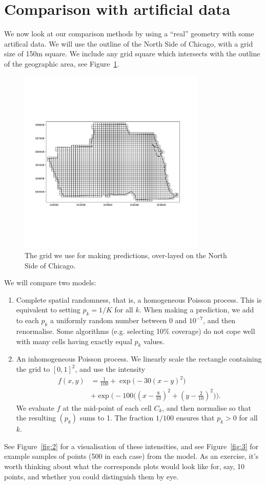 \documentclass[twoside,a4paper,twocolumn,10pt]{article}
\theoremstyle{plain}
\theoremstyle{definition}
\begin{document}
\section{Comparison with artificial data}

We now look at our comparison methods by using a ``real'' geometry with some artifical data.
We will use the outline of the North Side of Chicago, with a grid size of 150m square.  We
include any grid square which intersects with the outline of the geographic area, see
Figure~\ref{fig:1}.

\begin{figure}
    \centering
    \includegraphics[width=3.5in]{../details/grid_over_outline.pdf}
    \caption{\textsf{The grid we use for making predictions, over-layed on the North Side of Chicago.}}
    \label{fig:1}
\end{figure}

We will compare two models:
\begin{enumerate}
\item Complete spatial randomness, that is, a homogeneous Poisson process.  This is equivalent
  to setting $p_k = 1/K$ for all $k$.  When making a prediction, we add to each $p_k$ a uniformly
  random number between $0$ and $10^{-7}$, and then renormalise.  Some algorithms (e.g. selecting
  10\% coverage) do not cope well with many cells having exactly equal $p_k$ values.
\item An inhomogeneous Poisson process.  We linearly scale the rectangle containing the grid
  to $[0,1]^2$, and use the intensity
  \begin{align*} f(x,y) &= \frac{1}{100} + \exp\big( -30 (x-y)^2 \big) \\
  &+ \exp\big( -100\big( (x-\frac{8}{10})^2 + (y-\frac{2}{10})^2 \big) \big).
  \end{align*}
  We evaluate $f$ at the mid-point of each cell $C_k$, and then normalise so that the
  resulting $(p_k)$ sums to 1.  The fraction $1/100$ ensures that $p_k>0$ for all $k$.
\end{enumerate}
See Figure~\ref{fig:2} for a visualisation of these intensities, and see Figure~\ref{fig:3}
for example samples of points (500 in each case) from the model.  As an exercise, it's worth
thinking about what the corresponds plots would look like for, say, 10 points, and whether you
could distinguish them by eye.
\end{document}
